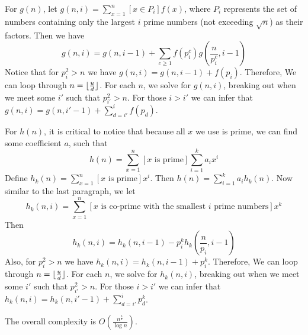 For $g(n)$, let $g(n, i)=\sum_{x=1}^{n}[x \in P_i]f(x)$, where $P_i$ represents the set of numbers containing only the largest $i$ prime numbers (not exceeding $\sqrt{n}$) as their factors.
Then we have
$$g(n, i) = g(n, i - 1) + \sum_{c \geq 1}f(p_i^c)g(\frac{n}{p_i^c}, i - 1)$$
Notice that for $p_i^2 > n$ we have $g(n, i) = g(n, i - 1) + f(p_i)$.
Therefore, We can loop through $n = \lfloor\frac{u}{d}\rfloor$. For each $n$, we solve for $g(n, i)$, breaking out when we meet some $i'$ such that $p_{i'}^2 > n$.
For those $i > i'$ we can infer that $g(n, i) = g(n, i' - 1) + \sum_{d = i'}^if(p_d)$.

For $h(n)$, it is critical to notice that because all $x$ we use is prime, we can find some coefficient $a$, such that 
$$h(n) = \sum_{x=1}^{n}[x \text{ is prime}]\sum_{i=1}^ka_ix^i$$
Define $h_k(n)=\sum_{x=1}^{n}[x \text{ is prime}]x^i$. Then $h(n)=\sum_{i=1}^{k}a_ih_k(n)$.
Now similar to the last paragraph, we let
$$h_k(n, i) = \sum_{x=1}^{n}[x \text{ is co-prime with the smallest } i \text { prime numbers}]x^k$$
Then
$$h_k(n, i) = h_k(n, i - 1) - p_i^kh_k(\frac{n}{p_i}, i - 1)$$
Also, for $p_i^2 > n$ we have $h_k(n, i) = h_k(n, i - 1) + p_i^k$.
Therefore, We can loop through $n = \lfloor\frac{u}{d}\rfloor$. For each $n$, we solve for $h_k(n, i)$, breaking out when we meet some $i'$ such that $p_{i'}^2 > n$.
For those $i > i'$ we can infer that $h_k(n, i) = h_k(n, i' - 1) + \sum_{d = i'}^ip_d^k$.

The overall complexity is $O(\frac{n^{\frac{3}{4}}}{\log n})$.


